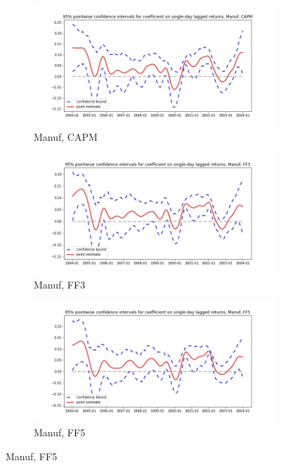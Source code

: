 \documentclass{article}
\begin{document}
  \begin{figure}
  \centering
  \begin{subfigure}[b]{0.3\textwidth}
    \centering
    \includegraphics[width=\textwidth]{Manuf/pointwiseCIs_CAPM.jpg}
    \caption{Manuf, CAPM}
    \label{fig:1}
  \end{subfigure}
  \begin{subfigure}[b]{0.3\textwidth}
    \centering
    \includegraphics[width=\textwidth]{Manuf/pointwiseCIs_FF3.jpg}
    \caption{Manuf, FF3}
    \label{fig:2}
  \end{subfigure}
    \begin{subfigure}[b]{0.3\textwidth}
    \centering
    \includegraphics[width=\textwidth]{Manuf/pointwiseCIs_FF5.jpg}
    \caption{Manuf, FF5}
    \label{fig:1}
  \end{subfigure}
  \end{figure}
  
\end{document}

